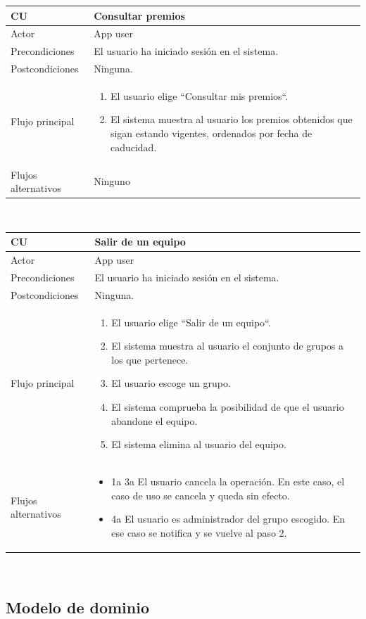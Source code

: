 \documentclass[twoside]{report}
\newcommand\addrow[2]{#1 &#2\\ }
\newcommand\addheading[2]{#1 &#2\\ \hline}
\newcommand\tabularhead{\begin{tabular}{lp{0.7\textwidth}}
\hline
}
\newenvironment{usecase}{\tabularhead}
{\hline\end{tabular}}
\begin{document}
\vspace{0.5cm}

\begin{usecase}
  \addheading{\textbf{CU\arabic{usecase}}}{Consultar premios} 
  \addrow{Actor}{App user}
  \addrow{Precondiciones}{El usuario ha iniciado sesión en el sistema.}
  \addrow{Postcondiciones}{Ninguna.}
  \addrow{Flujo principal}{
  		\begin{enumerate}
  		\item El usuario elige “Consultar mis premios“.
  		\item El sistema muestra al usuario los premios obtenidos que sigan estando vigentes, ordenados por fecha de caducidad.
  		\end{enumerate}
  }
  \addrow{Flujos alternativos}{Ninguno}
\end{usecase}\\

\vspace{0.5cm}

\begin{usecase}
  \addheading{\textbf{CU\arabic{usecase}}}{Salir de un equipo} 
  \addrow{Actor}{App user}
  \addrow{Precondiciones}{El usuario ha iniciado sesión en el sistema.}
  \addrow{Postcondiciones}{Ninguna.}
  \addrow{Flujo principal}{
  		\begin{enumerate}
  		\item El usuario elige “Salir de un equipo“. %
  		\item El sistema muestra al usuario el conjunto de grupos a los que pertenece. %
  		\item El usuario escoge un grupo. %
  		\item El sistema comprueba la posibilidad de que el usuario abandone el equipo. %
  		\item El sistema elimina al usuario del equipo.
  		\end{enumerate}
  }
  \addrow{Flujos alternativos}{
  		\begin{itemize}
  		\item 1a 3a El usuario cancela la operación. En este caso, el caso de uso se cancela y queda sin efecto.
  		\item 4a El usuario es administrador del grupo escogido. En ese caso se notifica y se vuelve al paso 2.
  		\end{itemize}
  }
\end{usecase}\\

\subsection{Modelo de dominio}
\end{document}

